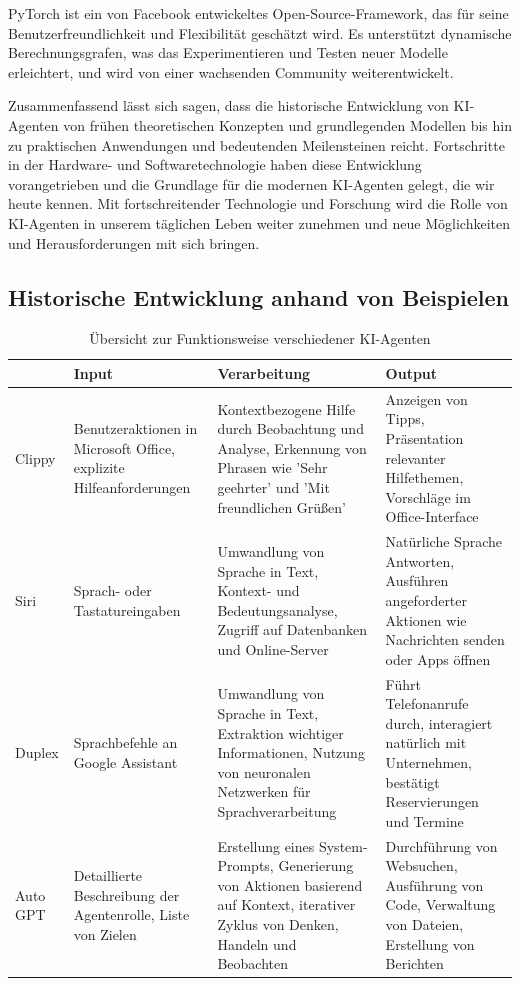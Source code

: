 \documentclass[conference]{IEEEtran}
\begin{document}
PyTorch ist ein von Facebook entwickeltes Open-Source-Framework, das für seine Benutzerfreundlichkeit und Flexibilität geschätzt wird. Es unterstützt dynamische Berechnungsgrafen, was das Experimentieren und Testen neuer Modelle erleichtert, und wird von einer wachsenden Community weiterentwickelt\cite{noauthor_pytorch_nodate}.

Zusammenfassend lässt sich sagen, dass die historische Entwicklung von KI-Agenten von frühen theoretischen Konzepten und grundlegenden Modellen bis hin zu praktischen Anwendungen und bedeutenden Meilensteinen reicht. Fortschritte in der Hardware- und Softwaretechnologie haben diese Entwicklung vorangetrieben und die Grundlage für die modernen KI-Agenten gelegt, die wir heute kennen. Mit fortschreitender Technologie und Forschung wird die Rolle von KI-Agenten in unserem täglichen Leben weiter zunehmen und neue Möglichkeiten und Herausforderungen mit sich bringen\cite{moto-oka_overview_1983}.

\subsection{Historische Entwicklung anhand von Beispielen}

\begin{table}[h!]
    \centering
    \begin{tabularx}{\textwidth}{|p{0.8cm}|X|X|X|} \hline 
         & Input & Verarbeitung & Output \\ \hline 
         Clippy & Benutzeraktionen in Microsoft Office, explizite Hilfeanforderungen & Kontextbezogene Hilfe durch Beobachtung und Analyse, Erkennung von Phrasen wie 'Sehr geehrter' und 'Mit freundlichen Grüßen' & Anzeigen von Tipps, Präsentation relevanter Hilfethemen, Vorschläge im Office-Interface \\ \hline 
         Siri & Sprach- oder Tastatureingaben & Umwandlung von Sprache in Text, Kontext- und Bedeutungsanalyse, Zugriff auf Datenbanken und Online-Server & Natürliche Sprache Antworten, Ausführen angeforderter Aktionen wie Nachrichten senden oder Apps öffnen \\ \hline 
         Duplex & Sprachbefehle an Google Assistant & Umwandlung von Sprache in Text, Extraktion wichtiger Informationen, Nutzung von neuronalen Netzwerken für Sprachverarbeitung & Führt Telefonanrufe durch, interagiert natürlich mit Unternehmen, bestätigt Reservierungen und Termine \\ \hline 
         Auto GPT & Detaillierte Beschreibung der Agentenrolle, Liste von Zielen & Erstellung eines System-Prompts, Generierung von Aktionen basierend auf Kontext, iterativer Zyklus von Denken, Handeln und Beobachten & Durchführung von Websuchen, Ausführung von Code, Verwaltung von Dateien, Erstellung von Berichten \\ \hline
    \end{tabularx}
    \caption{Übersicht zur Funktionsweise verschiedener KI-Agenten}
\end{table}
\end{document}
